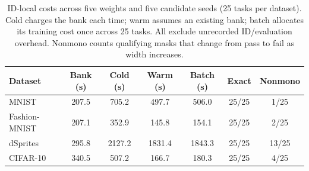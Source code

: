 \begin{table}[H]
\caption{ID-local costs across five weights and five candidate seeds (25 tasks per dataset). Cold charges the bank each time; warm assumes an existing bank; batch allocates its training cost once across 25 tasks. All exclude unrecorded ID/evaluation overhead. Nonmono counts qualifying masks that change from pass to fail as width increases.}\label{tab:amortization}
\small
\setlength{\tabcolsep}{3pt}
\begin{tabular*}{\textwidth}{@{\extracolsep{\fill}}lcccccc@{}}
\toprule
Dataset & Bank (s) & Cold (s) & Warm (s) & Batch (s) & Exact & Nonmono \\
\midrule
MNIST & 207.5 & 705.2 & 497.7 & 506.0 & 25/25 & 1/25 \\
Fashion-MNIST & 207.1 & 352.9 & 145.8 & 154.1 & 25/25 & 2/25 \\
dSprites & 295.8 & 2127.2 & 1831.4 & 1843.3 & 25/25 & 13/25 \\
CIFAR-10 & 340.5 & 507.2 & 166.7 & 180.3 & 25/25 & 4/25 \\
\bottomrule\end{tabular*}
\end{table}
